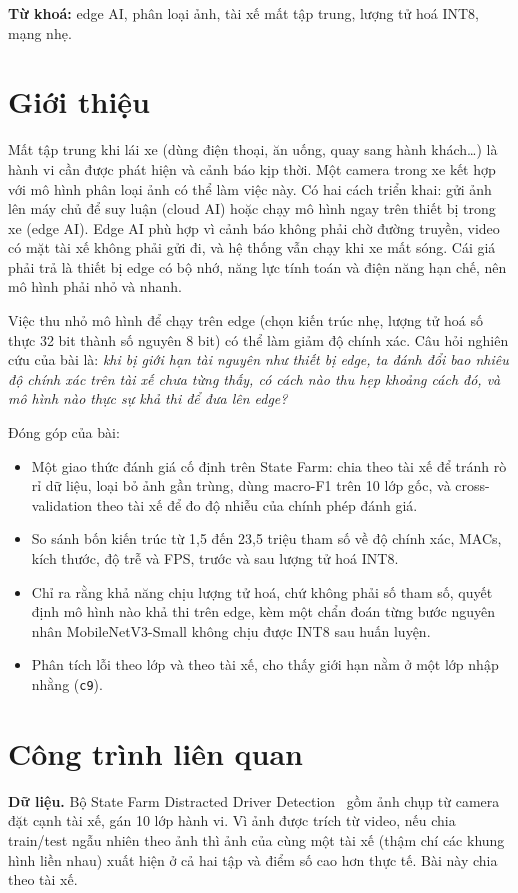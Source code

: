 \documentclass[10pt,a4paper,twocolumn]{article}
\newcommand{\cls}[1]{\texttt{#1}}
\begin{document}
\noindent\textbf{Từ khoá:} edge AI, phân loại ảnh, tài xế mất tập trung, lượng tử hoá INT8, mạng nhẹ.

\section{Giới thiệu}
Mất tập trung khi lái xe (dùng điện thoại, ăn uống, quay sang hành khách\ldots) là hành vi cần được phát hiện và cảnh báo kịp thời. Một camera trong xe kết hợp với mô hình phân loại ảnh có thể làm việc này. Có hai cách triển khai: gửi ảnh lên máy chủ để suy luận (cloud AI) hoặc chạy mô hình ngay trên thiết bị trong xe (edge AI). Edge AI phù hợp vì cảnh báo không phải chờ đường truyền, video có mặt tài xế không phải gửi đi, và hệ thống vẫn chạy khi xe mất sóng. Cái giá phải trả là thiết bị edge có bộ nhớ, năng lực tính toán và điện năng hạn chế, nên mô hình phải nhỏ và nhanh.

Việc thu nhỏ mô hình để chạy trên edge (chọn kiến trúc nhẹ, lượng tử hoá số thực 32 bit thành số nguyên 8 bit) có thể làm giảm độ chính xác. Câu hỏi nghiên cứu của bài là:
\emph{khi bị giới hạn tài nguyên như thiết bị edge, ta đánh đổi bao nhiêu độ chính xác trên tài xế chưa từng thấy, có cách nào thu hẹp khoảng cách đó, và mô hình nào thực sự khả thi để đưa lên edge?}

Đóng góp của bài:
\begin{itemize}
\item Một giao thức đánh giá cố định trên State Farm: chia theo tài xế để tránh rò rỉ dữ liệu, loại bỏ ảnh gần trùng, dùng macro-F1 trên 10 lớp gốc, và cross-validation theo tài xế để đo độ nhiễu của chính phép đánh giá.
\item So sánh bốn kiến trúc từ 1,5 đến 23,5 triệu tham số về độ chính xác, MACs, kích thước, độ trễ và FPS, trước và sau lượng tử hoá INT8.
\item Chỉ ra rằng khả năng chịu lượng tử hoá, chứ không phải số tham số, quyết định mô hình nào khả thi trên edge, kèm một chẩn đoán từng bước nguyên nhân MobileNetV3-Small không chịu được INT8 sau huấn luyện.
\item Phân tích lỗi theo lớp và theo tài xế, cho thấy giới hạn nằm ở một lớp nhập nhằng (\cls{c9}).
\end{itemize}

\section{Công trình liên quan}
\textbf{Dữ liệu.} Bộ State Farm Distracted Driver Detection~\cite{statefarm} gồm ảnh chụp từ camera đặt cạnh tài xế, gán 10 lớp hành vi. Vì ảnh được trích từ video, nếu chia train/test ngẫu nhiên theo ảnh thì ảnh của cùng một tài xế (thậm chí các khung hình liền nhau) xuất hiện ở cả hai tập và điểm số cao hơn thực tế. Bài này chia theo tài xế.
\end{document}
